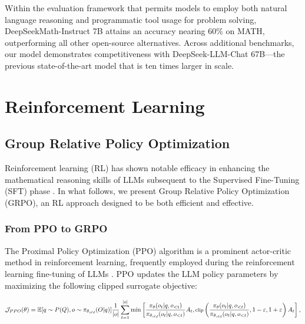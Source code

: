 \begin{itemize}[topsep=0pt]
Within the evaluation framework that permits models to employ both natural language reasoning and programmatic tool usage for problem solving, DeepSeekMath-Instruct 7B attains an accuracy nearing 60\% on MATH, outperforming all other open-source alternatives. Across additional benchmarks, our model demonstrates competitiveness with DeepSeek-LLM-Chat 67B—the previous state-of-the-art model that is ten times larger in scale.

\section{Reinforcement Learning}

\subsection{Group Relative Policy Optimization} Reinforcement learning (RL) has shown notable efficacy in enhancing the mathematical reasoning skills of LLMs subsequent to the Supervised Fine-Tuning (SFT) phase \citep{wang2023math,wizardmath}. In what follows, we present Group Relative Policy Optimization (GRPO), an RL approach designed to be both efficient and effective.

\subsubsection{From PPO to GRPO} The Proximal Policy Optimization (PPO) algorithm \citep{schulman2017proximal} is a prominent actor-critic method in reinforcement learning, frequently employed during the reinforcement learning fine-tuning of LLMs \citep{ouyang2022training}. PPO updates the LLM policy parameters by maximizing the following clipped surrogate objective:

\begin{equation}
\footnotesize
    \mathcal{J}_{PPO}(\theta) = \mathbb{E}{[q \sim P(Q), o \sim \pi_{\theta_{old}}(O|q)]} \frac{1}{|o|} \sum_{t=1}^{|o|} \min \left[ \frac{\pi_\theta(o_{t} | q, o_{<t})}{\pi_{\theta_{old}}(o_{t} | q, o_{<t})} A_{t}, \text{clip} \left( \frac{\pi_\theta(o_{t} | q, o_{<t})}{\pi_{\theta_{old}}(o_{t} | q, o_{<t})}, 1 - \varepsilon, 1 + \varepsilon \right)  A_{t} \right] ,
\end{equation}


\end{itemize}
